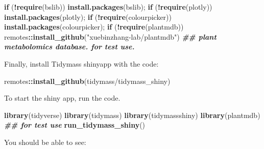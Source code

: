 \documentclass[
]{book}
\newenvironment{Shaded}{\begin{snugshade}}{\end{snugshade}}
\newcommand{\ControlFlowTok}[1]{\textcolor[rgb]{0.13,0.29,0.53}{\textbf{#1}}}
\newcommand{\DocumentationTok}[1]{\textcolor[rgb]{0.56,0.35,0.01}{\textbf{\textit{#1}}}}
\newcommand{\FunctionTok}[1]{\textcolor[rgb]{0.13,0.29,0.53}{\textbf{#1}}}
\newcommand{\NormalTok}[1]{#1}
\newcommand{\SpecialCharTok}[1]{\textcolor[rgb]{0.81,0.36,0.00}{\textbf{#1}}}
\newcommand{\StringTok}[1]{\textcolor[rgb]{0.31,0.60,0.02}{#1}}
\begin{document}
\begin{Shaded}
\begin{Highlighting}[]
\ControlFlowTok{if}\NormalTok{ (}\SpecialCharTok{!}\FunctionTok{require}\NormalTok{(}\StringTok{\textquotesingle{}bslib\textquotesingle{}}\NormalTok{)) }\FunctionTok{install.packages}\NormalTok{(}\StringTok{\textquotesingle{}bslib\textquotesingle{}}\NormalTok{);}
\ControlFlowTok{if}\NormalTok{ (}\SpecialCharTok{!}\FunctionTok{require}\NormalTok{(}\StringTok{\textquotesingle{}plotly\textquotesingle{}}\NormalTok{)) }\FunctionTok{install.packages}\NormalTok{(}\StringTok{\textquotesingle{}plotly\textquotesingle{}}\NormalTok{);}
\ControlFlowTok{if}\NormalTok{ (}\SpecialCharTok{!}\FunctionTok{require}\NormalTok{(}\StringTok{\textquotesingle{}colourpicker\textquotesingle{}}\NormalTok{)) }\FunctionTok{install.packages}\NormalTok{(}\StringTok{\textquotesingle{}colourpicker\textquotesingle{}}\NormalTok{);}
\ControlFlowTok{if}\NormalTok{ (}\SpecialCharTok{!}\FunctionTok{require}\NormalTok{(}\StringTok{\textquotesingle{}plantmdb\textquotesingle{}}\NormalTok{)) remotes}\SpecialCharTok{::}\FunctionTok{install\_github}\NormalTok{(}\StringTok{"xuebinzhang{-}lab/plantmdb"}\NormalTok{)  }\DocumentationTok{\#\# plant metabolomics database. for test use.}
\end{Highlighting}
\end{Shaded}

Finally, install Tidymass shinyapp with the code:

\begin{Shaded}
\begin{Highlighting}[]
\NormalTok{remotes}\SpecialCharTok{::}\FunctionTok{install\_github}\NormalTok{(}\StringTok{\textquotesingle{}tidymass/tidymass\_shiny\textquotesingle{}}\NormalTok{)}
\end{Highlighting}
\end{Shaded}

To start the shiny app, run the code.

\begin{Shaded}
\begin{Highlighting}[]
\FunctionTok{library}\NormalTok{(tidyverse)}
\FunctionTok{library}\NormalTok{(tidymass)}
\FunctionTok{library}\NormalTok{(tidymassshiny)}
\FunctionTok{library}\NormalTok{(plantmdb) }\DocumentationTok{\#\# for test use}
\FunctionTok{run\_tidymass\_shiny}\NormalTok{()}
\end{Highlighting}
\end{Shaded}

You should be able to see:
\end{document}

